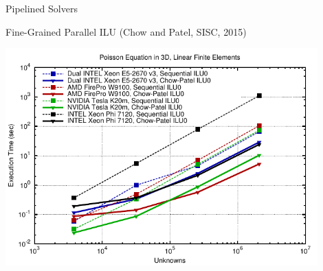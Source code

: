 \begin{frame}{Pipelined Solvers}
  \begin{block}{Fine-Grained Parallel ILU (Chow and Patel, SISC, 2015)}
  \vspace*{-.2cm}
   \begin{center}
    \includegraphics[width=0.9\textwidth]{figures/ilu-3d}
   \end{center}
  \end{block}
\end{frame}

